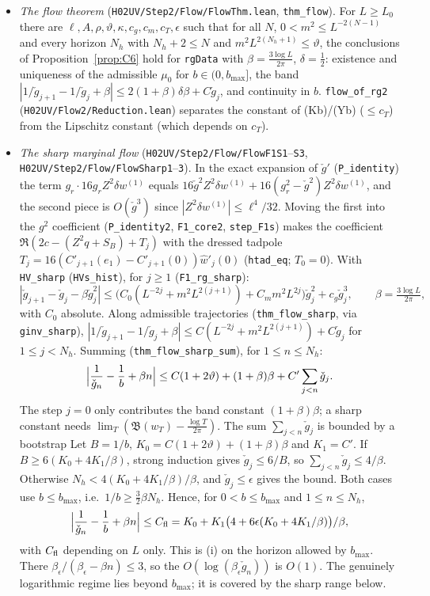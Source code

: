 \documentclass[11pt]{amsart}
\theoremstyle{definition}
\theoremstyle{remark}
\numberwithin{equation}{section}
\begin{document}
\begin{itemize}
  (LG), (Lm), (LT) with $a=C(\epsilon+\vartheta)$, under $m^2L^{2(j+2)}\le\vartheta$.
\item \emph{The flow theorem} (\texttt{H02UV/Step2/Flow/FlowThm.lean}, \texttt{thm\_flow}). For $L\ge L_0$ there are
  $\ell,A,\rho,\vartheta,\kappa,c_g,c_m,c_T,\epsilon$ such that for all $N$, $0<m^2\le L^{-2(N-1)}$ and
  every horizon $N_h$ with $N_h+2\le N$ and $m^2L^{2(N_h+1)}\le\vartheta$, the conclusions of
  Proposition~\ref{prop:C6} hold for \texttt{rgData} with $\beta=\frac{3\log L}{2\pi}$, $\delta=\frac12$:
  existence and uniqueness of the admissible $\mu_0$ for $b\in(0,b_{\max}]$, the band
  $|1/\check g_{j+1}-1/\check g_j+\beta|\le2(1+\beta)\delta\beta+C\check g_j$, and continuity in $b$.
  \texttt{flow\_of\_rg2} (\texttt{H02UV/Flow2/Reduction.lean}) separates the constant of (Kb)/(Yb)
  ($\le c_T$) from the Lipschitz constant (which depends on $c_T$).
\item \emph{The sharp marginal flow} (\texttt{H02UV/Step2/Flow/FlowF1S1}--\texttt{S3}, \texttt{H02UV/Step2/Flow/FlowSharp1}--\texttt{3}).
In the exact expansion of $\check g'$ (\texttt{P\_identity}) the term $g_r\cdot16g_rZ^2\delta w^{(1)}$ equals
$16\check g^2Z^2\delta w^{(1)}+16(g_r^2-\check g^2)Z^2\delta w^{(1)}$, and the second piece is $O(\check g^3)$ since
$|Z^2\delta w^{(1)}|\le\ell^4/32$. Moving the first into the $g^2$ coefficient
(\texttt{P\_identity2}, \texttt{F1\_core2}, \texttt{step\_F1s}) makes the coefficient
$\Re(2c-(Z^2q+S_B)+T_j)$ with the dressed tadpole $T_j=16(C'_{j+1}(e_1)-C'_{j+1}(0))\hat w'_j(0)$
(\texttt{htad\_eq}; $T_0=0$). With \texttt{HV\_sharp} (\texttt{HVs\_hist}), for $j\ge1$ (\texttt{F1\_rg\_sharp}):
\[
  |\check g_{j+1}-\check g_j-\beta\check g_j^2|\le\bigl(C_0(L^{-2j}+m^2L^{2(j+1)})+C_mm^2L^{2j}\bigr)\check g_j^2
    +c_g\check g_j^3,\qquad\beta=\tfrac{3\log L}{2\pi},
\]
with $C_0$ absolute. Along admissible trajectories (\texttt{thm\_flow\_sharp}, via \texttt{ginv\_sharp}),
$|1/\check g_{j+1}-1/\check g_j+\beta|\le C(L^{-2j}+m^2L^{2(j+1)})+C\check g_j$ for $1\le j<N_h$. Summing
(\texttt{thm\_flow\_sharp\_sum}), for $1\le n\le N_h$:
\[
  \Bigl|\frac1{\check g_n}-\frac1b+\beta n\Bigr|\le C(1+2\vartheta)+(1+\beta)\beta+C'\sum_{j<n}\check g_j .
\]
The step $j=0$ only contributes the band constant $(1+\beta)\beta$; a sharp constant needs
$\lim_T(\mathfrak B(w_T)-\frac{\log T}{2\pi})$. The sum $\sum_{j<n}\check g_j$ is bounded by a bootstrap
Let $B=1/b$, $K_0=C(1+2\vartheta)+(1+\beta)\beta$ and $K_1=C'$.
If $B\ge6(K_0+4K_1/\beta)$, strong induction gives $\check g_j\le6/B$, so $\sum_{j<n}\check g_j\le4/\beta$.
Otherwise $N_h<4(K_0+4K_1/\beta)/\beta$, and $\check g_j\le\epsilon$ gives the bound. Both cases use
$b\le b_{\max}$, i.e.\ $1/b\ge\frac32\beta N_h$. Hence,
for $0<b\le b_{\max}$ and $1\le n\le N_h$,
\[
  \Bigl|\frac1{\check g_n}-\frac1b+\beta n\Bigr|\le C_{\rm fl}
    =K_0+K_1\bigl(4+6\epsilon(K_0+4K_1/\beta)\bigr)/\beta ,
\]
with $C_{\rm fl}$ depending on $L$ only. This is (i) on the horizon allowed by $b_{\max}$. There
$\beta_\epsilon/(\beta_\epsilon-\beta n)\le3$, so the $O(\log(\beta_\epsilon\check g_n))$ is $O(1)$. The genuinely
logarithmic regime lies beyond $b_{\max}$; it is covered by the sharp range below.


\end{itemize}
\end{document}
